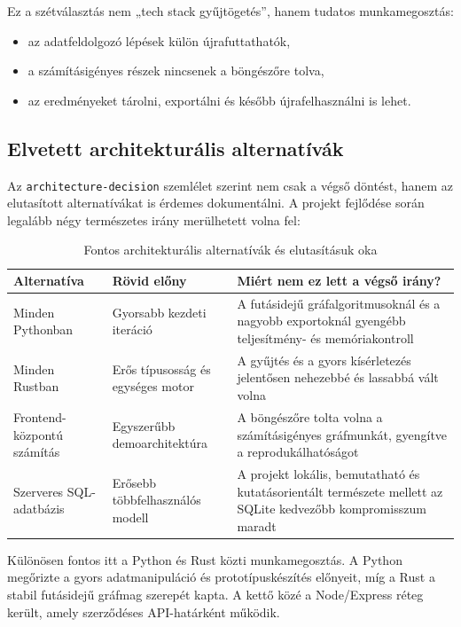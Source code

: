 \documentclass[a4paper,12pt]{report}
\begin{document}
Ez a szétválasztás nem „tech stack gyűjtögetés”, hanem tudatos munkamegosztás:

\begin{itemize}
    \item az adatfeldolgozó lépések külön újrafuttathatók,
    \item a számításigényes részek nincsenek a böngészőre tolva,
    \item az eredményeket tárolni, exportálni és később újrafelhasználni is lehet.
\end{itemize}

\subsection{Elvetett architekturális alternatívák}

Az \texttt{architecture-decision} szemlélet szerint nem csak a végső döntést, hanem az elutasított alternatívákat is érdemes dokumentálni. A projekt fejlődése során legalább négy természetes irány merülhetett volna fel:

\begin{table}[H]
\centering
\caption{Fontos architekturális alternatívák és elutasításuk oka}
\begin{tabularx}{\textwidth}{>{\raggedright\arraybackslash}p{3.5cm} >{\raggedright\arraybackslash}p{3.6cm} X}
\toprule
\textbf{Alternatíva} & \textbf{Rövid előny} & \textbf{Miért nem ez lett a végső irány?} \\
\midrule
Minden Pythonban & Gyorsabb kezdeti iteráció & A futásidejű gráfalgoritmusoknál és a nagyobb exportoknál gyengébb teljesítmény- és memóriakontroll \\
Minden Rustban & Erős típusosság és egységes motor & A gyűjtés és a gyors kísérletezés jelentősen nehezebbé és lassabbá vált volna \\
Frontend-központú számítás & Egyszerűbb demoarchitektúra & A böngészőre tolta volna a számításigényes gráfmunkát, gyengítve a reprodukálhatóságot \\
Szerveres SQL-adatbázis & Erősebb többfelhasználós modell & A projekt lokális, bemutatható és kutatásorientált természete mellett az SQLite kedvezőbb kompromisszum maradt \\
\bottomrule
\end{tabularx}
\end{table}

Különösen fontos itt a Python és Rust közti munkamegosztás. A Python megőrizte a gyors adatmanipuláció és prototípuskészítés előnyeit, míg a Rust a stabil futásidejű gráfmag szerepét kapta. A kettő közé a Node/Express réteg került, amely szerződéses API-határként működik.
\end{document}
